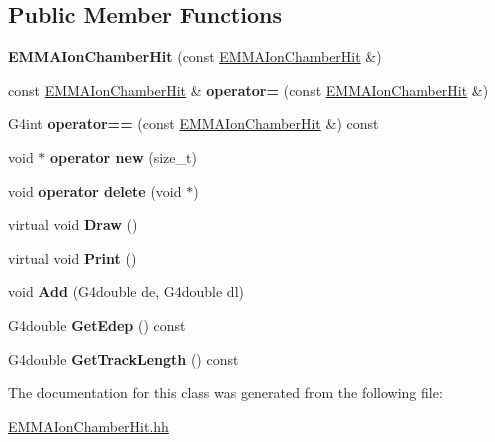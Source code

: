 \subsection*{Public Member Functions}
\begin{DoxyCompactItemize}
\item 
\hypertarget{classEMMAIonChamberHit_a03c3e59efa7a8abfc4294613d6faf345}{{\bfseries E\-M\-M\-A\-Ion\-Chamber\-Hit} (const \hyperlink{classEMMAIonChamberHit}{E\-M\-M\-A\-Ion\-Chamber\-Hit} \&)}\label{classEMMAIonChamberHit_a03c3e59efa7a8abfc4294613d6faf345}

\item 
\hypertarget{classEMMAIonChamberHit_ad3777b164c0d892b2e313ee7cc5250d3}{const \hyperlink{classEMMAIonChamberHit}{E\-M\-M\-A\-Ion\-Chamber\-Hit} \& {\bfseries operator=} (const \hyperlink{classEMMAIonChamberHit}{E\-M\-M\-A\-Ion\-Chamber\-Hit} \&)}\label{classEMMAIonChamberHit_ad3777b164c0d892b2e313ee7cc5250d3}

\item 
\hypertarget{classEMMAIonChamberHit_a722ef0deb569abe0db3b2edc57bf0218}{G4int {\bfseries operator==} (const \hyperlink{classEMMAIonChamberHit}{E\-M\-M\-A\-Ion\-Chamber\-Hit} \&) const }\label{classEMMAIonChamberHit_a722ef0deb569abe0db3b2edc57bf0218}

\item 
\hypertarget{classEMMAIonChamberHit_a8a1a1579a39cf66b06c5250082fa9211}{void $\ast$ {\bfseries operator new} (size\-\_\-t)}\label{classEMMAIonChamberHit_a8a1a1579a39cf66b06c5250082fa9211}

\item 
\hypertarget{classEMMAIonChamberHit_abadf1dbdcf33fb515226e1acb5ceb0bd}{void {\bfseries operator delete} (void $\ast$)}\label{classEMMAIonChamberHit_abadf1dbdcf33fb515226e1acb5ceb0bd}

\item 
\hypertarget{classEMMAIonChamberHit_a2119bc84fec4904d53bf88e154983605}{virtual void {\bfseries Draw} ()}\label{classEMMAIonChamberHit_a2119bc84fec4904d53bf88e154983605}

\item 
\hypertarget{classEMMAIonChamberHit_a41a76101e2f0faf2201e6fd5792254cd}{virtual void {\bfseries Print} ()}\label{classEMMAIonChamberHit_a41a76101e2f0faf2201e6fd5792254cd}

\item 
\hypertarget{classEMMAIonChamberHit_af688556d82929479e004e0b87568ecfd}{void {\bfseries Add} (G4double de, G4double dl)}\label{classEMMAIonChamberHit_af688556d82929479e004e0b87568ecfd}

\item 
\hypertarget{classEMMAIonChamberHit_a860a0546567cd25f41f9a28c48dd913a}{G4double {\bfseries Get\-Edep} () const }\label{classEMMAIonChamberHit_a860a0546567cd25f41f9a28c48dd913a}

\item 
\hypertarget{classEMMAIonChamberHit_a90dfd4ddd328e40aa2294eab4ee30ec3}{G4double {\bfseries Get\-Track\-Length} () const }\label{classEMMAIonChamberHit_a90dfd4ddd328e40aa2294eab4ee30ec3}

\end{DoxyCompactItemize}


The documentation for this class was generated from the following file\-:\begin{DoxyCompactItemize}
\item 
\hyperlink{EMMAIonChamberHit_8hh}{E\-M\-M\-A\-Ion\-Chamber\-Hit.\-hh}\end{DoxyCompactItemize}
